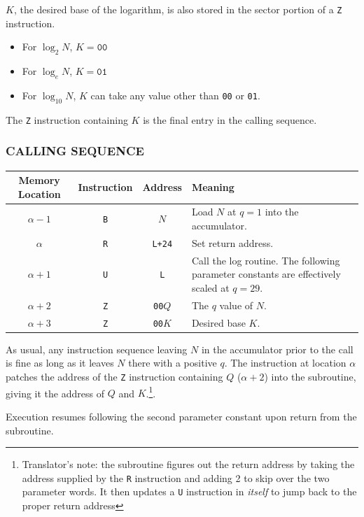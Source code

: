 $K$, the desired base of the logarithm, is also stored in the sector portion of a \texttt{Z} instruction.
\begin{itemize}
    \item For $\log_2 N$, $K = \texttt{00}$
    \item For $\log_e N$, $K = \texttt{01}$
    \item For $\log_{10} N$, $K$ can take any value other than \texttt{00} or \texttt{01}. 
\end{itemize}
The \texttt{Z} instruction containing $K$ is the final entry in the calling sequence.

\subsubsection*{CALLING SEQUENCE}
\begin{table}[h!]
\centering
\begin{tabularx}{\textwidth}{cccX}
\toprule
\textbf{Memory Location} & \textbf{Instruction} & \textbf{Address} & \textbf{Meaning} \\
\midrule
$\alpha-1$ & \texttt{B} & $N$ & Load $N$ at $q=1$ into the accumulator. \\
$\alpha$ & \texttt{R} & \texttt{L+24} & Set return address. \\
$\alpha+1$ & \texttt{U} & \texttt{L} & Call the log routine. The following parameter constants are effectively scaled at $q=29$. \\
$\alpha+2$ & \texttt{Z} & \texttt{00}$Q$ & The $q$ value of $N$. \\
$\alpha+3$ & \texttt{Z} & \texttt{00}$K$ & Desired base $K$. \\
\bottomrule
\end{tabularx}
\end{table}
As usual, any instruction sequence leaving $N$ in the accumulator prior to the call is fine as long as it leaves $N$ there with a positive $q$. The instruction at location $\alpha$ patches the address of the \texttt{Z} instruction containing $Q$ ($\alpha+2$) into the subroutine, giving it the address of $Q$ and $K$.\footnote{Translator's note: the subroutine figures out the return address by taking the address supplied by the \texttt{R} instruction and adding 2 to skip over the two parameter words. It then updates a \texttt{U} instruction in \emph{itself} to jump back to the proper return address}.

Execution resumes following the second parameter constant upon return from the subroutine.

